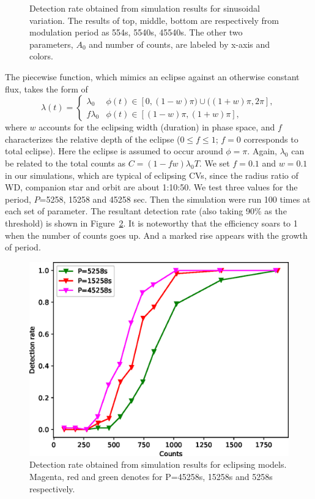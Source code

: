 \documentclass[fleqn,usenatbib]{mnras}
\begin{document}
\begin{figure}
\begin{minipage}[b]{0.45\textwidth}
\end{minipage}
\caption{Detection rate obtained from simulation results for sinusoidal variation. The results of top, middle, bottom are respectively from modulation period as 554s, 5540s, 45540s. The other two parameters, $A_{0}$ and number of counts, are labeled by x-axis and colors. \label{fig:detection}}
\end{figure}

The piecewise function, which mimics an eclipse against an otherwise constant flux, takes the form of
\begin{equation}
\lambda(t)=
\begin{cases}
\lambda_0 & \text{$\phi(t) \in[0,(1-w)\pi)\cup ((1+w)\pi,2\pi]$},\\
f\lambda_0 & \text{$\phi(t) \in[(1-w)\pi,(1+w)\pi]$},
\end{cases}	
\end{equation}
where $w$ accounts for the eclipsing width (duration) in phase space, and $f$ characterizes the relative depth of the eclipse ($0\leq f \leq 1$; $f = 0$ corresponds to total eclipse). Here the eclipse is assumed to occur around $\phi = \pi$. 
Again, $\lambda_0$ can be related to the total counts as $C=(1-fw)\lambda_0T$.
We set $f=0.1$ and $w=0.1$ in our simulations, which are typical of eclipsing CVs, since the radius ratio of WD, companion star and orbit are about 1:10:50. 
We test three values for the period, $P$=5258, 15258 and 45258 sec. 
Then the simulation were run 100 times at each set of parameter. The resultant detection rate (also taking 90\% as the threshold) is shown in Figure~\ref{fig:eclipse}. It is noteworthy that the efficiency soars to 1 when the number of counts goes up. And a marked rise appears with the growth of period.
 
\begin{figure}
\centering
\includegraphics[scale=0.61]{./figure/sim_LW/eclipse_cut.eps}
\caption{Detection rate obtained from simulation results for eclipsing models. Magenta, red and green denotes for P=45258s, 15258s and 5258s respectively. }\label{fig:eclipse}
\end{figure}
\end{document}
